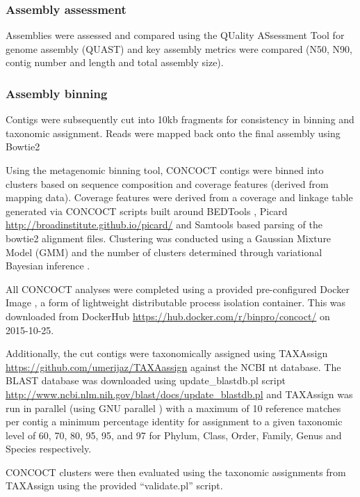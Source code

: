 \subsubsection{Assembly assessment}

Assemblies were assessed and compared using the
QUality ASsessment Tool for genome assembly (QUAST) \citep{Gurevich2013a}
and key assembly metrics were compared (N50, N90, contig number
and length and total assembly size).

\subsubsection{Assembly binning}

Contigs were subsequently cut into 10kb fragments for consistency
in binning and taxonomic assignment.
Reads were mapped back onto the final assembly using Bowtie2 
\citep{Langmead2012} 

Using the metagenomic binning tool, CONCOCT \citep{Alneberg2014}
contigs were binned into clusters based on sequence composition
and coverage features (derived from mapping data).
Coverage features were derived from a coverage and linkage table
generated via CONCOCT scripts built around BEDTools \citep{Quinlan2010,Quinlan2014}, Picard \url{http://broadinstitute.github.io/picard/} 
and Samtools \citep{Li2009} 
based parsing
of the bowtie2 alignment files.
Clustering was conducted using a Gaussian Mixture Model (GMM) \citep{Bishop2006}
and the number of clusters determined through variational Bayesian inference \citep{Corduneanu2001}.

All CONCOCT analyses were completed using a provided pre-configured 
Docker Image \citep{Merkel2014}, a form of lightweight 
distributable process isolation container.
This was downloaded from DockerHub \url{https://hub.docker.com/r/binpro/concoct/}
on 2015-10-25.

Additionally, the cut contigs were taxonomically assigned 
using TAXAssign \url{https://github.com/umerijaz/TAXAassign} against the NCBI nt database. 
The BLAST database was downloaded using update\_blastdb.pl script \url{http://www.ncbi.nlm.nih.gov/blast/docs/update_blastdb.pl}
and TAXAssign was run in parallel (using GNU parallel \citep{Tange2011a})
with a maximum of 10 reference matches
per contig a minimum percentage identity for assignment
to a given taxonomic level of 60, 70, 80, 95, 95, and 97
for Phylum, Class, Order, Family, Genus and Species respectively. 

CONCOCT clusters were then evaluated using the taxonomic assignments from TAXAssign
using the provided ``validate.pl'' script.

